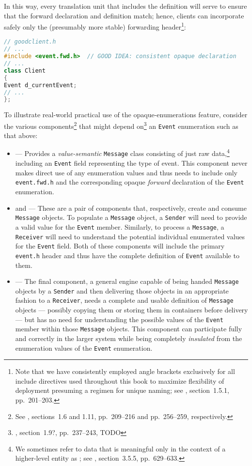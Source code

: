 \noindent In this way, every translation unit that includes the definition will
serve to ensure that the forward declaration and definition match;
hence, clients can incorporate safely only the (presumably more stable)
forwarding header{\cprotect\footnote{Note that we have consistently
employed angle brackets exclusively for all include directives used
throughout this book to maximize flexibility of deployment presuming a
regimen for unique naming; see \cite{lakos20}, section~1.5.1,
pp.~201--203.}}:

\begin{lstlisting}[language=C++]
// goodclient.h
// ...
#include <event.fwd.h>  // GOOD IDEA: consistent opaque declaration
// ...
class Client
{
Event d_currentEvent;
// ...
};
\end{lstlisting}

\noindent To illustrate real-world practical use of the opaque-enumerations
feature, consider the various components{\cprotect\footnote{See
\cite{lakos20}, sections~1.6 and 1.11, pp.~209--216 and
pp.~256--259, respectively.}} that might depend
on{\cprotect\footnote{\cite{lakos20}, section~1.9?, pp.~237--243,
TODO}} an \lstinline!Event! enumeration such as that above:
\begin{itemize}
\item{ — Provides a \emph{value-semantic} \lstinline!Message! class consisting of just raw data,\cprotect\footnote{We sometimes refer to data that is meaningful only in the context of a higher-level entity as ; see \cite{lakos20}, section~3.5.5, pp.~629--633.} including an \lstinline!Event! field representing the type of event. This component never makes direct use of any enumeration values and thus needs to include only \lstinline!event.fwd.h! and the corresponding opaque \emph{forward} declaration of the \lstinline!Event! enumeration.}
\item{ and  — These are a pair of components that, respectively, create and consume \lstinline!Message! objects. To populate a \lstinline!Message! object, a \lstinline!Sender! will need to provide a valid value for the \lstinline!Event! member. Similarly, to process a \lstinline!Message!, a \lstinline!Receiver! will need to understand the potential individual enumerated values for the \lstinline!Event! field. Both of these components will include the primary \lstinline!event.h! header and thus have the complete definition of \lstinline!Event! available to them.}
\item{ — The final component, a general engine capable of being handed \lstinline!Message! objects by a \lstinline!Sender! and then delivering those objects in an appropriate fashion to a \lstinline!Receiver!, needs a complete and usable definition of \lstinline!Message! objects — possibly copying them or storing them in containers before delivery — but has no need for understanding the possible values of the \lstinline!Event! member within those \lstinline!Message! objects. This component can participate fully and correctly in the larger system while being completely \emph{insulated} from the enumeration values of the \lstinline!Event! enumeration.}
\end{itemize}
